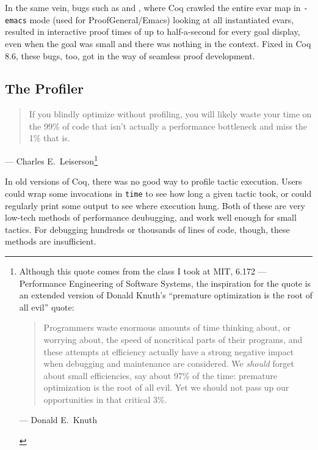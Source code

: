 In the same vein, bugs such as  and , where Coq crawled the entire evar map in \texttt{-emacs} mode (used for ProofGeneral/Emacs) looking at all instantiated evars, resulted in interactive proof times of up to half-a-second for every goal display, even when the goal was small and there was nothing in the context.
Fixed in Coq 8.6, these bugs, too, got in the way of seamless proof development.

\subsection{The \Ltac\space Profiler}\label{sec:ltac-prof}
\begin{quote}
  If you blindly optimize without profiling, you will likely waste your time on the 99\% of code that isn't actually a performance bottleneck and miss the 1\% that is.
\end{quote}
\begin{flushright}
  --- Charles E.~Leiserson\footnote{%
Although this quote comes from the class I took at MIT, 6.172 --- Performance Engineering of Software Systems, the inspiration for the quote is an extended version of Donald Knuth's ``premature optimization is the root of all evil'' quote:
\begin{quote}
  Programmers waste enormous amounts of time thinking about, or worrying about, the speed of noncritical parts of their programs, and these attempts at efficiency actually have a strong negative impact when debugging and maintenance are considered.
  We \emph{should} forget about small efficiencies, say about 97\% of the time: premature optimization is the root of all evil.
  Yet we should not pass up our opportunities in that critical 3\%.
\end{quote}
\begin{flushright}
  --- Donald E.~Knuth~\cite[p.~268]{KnuthPrematureOptimizationExtended}
\end{flushright}%
}%
~\cite{Profiling2020Leiserson}
\end{flushright}

In old versions of Coq, there was no good way to profile tactic execution.
Users could wrap some invocations in \texttt{time} to see how long a given tactic took, or could regularly print some output to see where execution hung.
Both of these are very low-tech methods of performance deubugging, and work well enough for small tactics.
For debugging hundreds or thousands of lines of \Ltac\space code, though, these methods are insufficient.

